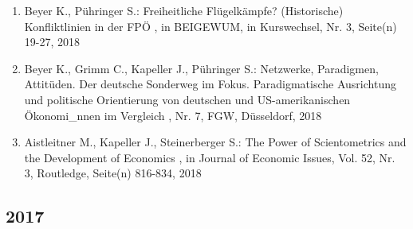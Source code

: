 \begin{enumerate}[leftmargin=*, labelsep=0.5cm]
	 \item Beyer K., Pühringer S.:  Freiheitliche Flügelkämpfe? (Historische) Konfliktlinien in der FPÖ  , in BEIGEWUM, in Kurswechsel, Nr. 3, Seite(n) 19-27, 2018
	 \item Beyer K., Grimm C., Kapeller J., Pühringer S.:  Netzwerke, Paradigmen, Attitüden. Der deutsche Sonderweg im Fokus. Paradigmatische Ausrichtung und politische Orientierung von deutschen und US-amerikanischen Ökonomi_nnen im Vergleich  , Nr. 7, FGW, Düsseldorf, 2018
	 \item Aistleitner M., Kapeller J., Steinerberger S.:  The Power of Scientometrics and the Development of Economics  , in Journal of Economic Issues, Vol. 52, Nr. 3, Routledge, Seite(n) 816-834, 2018
\end{enumerate} 
 \subsection*{2017} 
